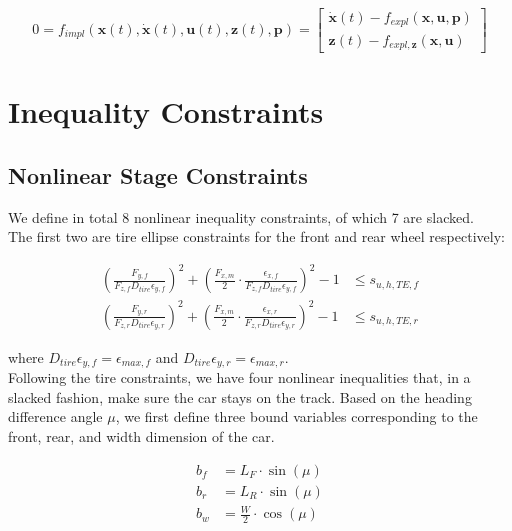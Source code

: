 \documentclass[
a4paper, %
10pt, %
notitlepage,
english]{CSUniSchoolLabReport}
\begin{document}
\begin{equation}
	0 = f_{impl}(\mathbf{x}(t), \dot{\mathbf{x}}(t), \mathbf{u}(t), \mathbf{z}(t), \mathbf{p}) = 
	\left[\begin{array}{c}
		\dot{\mathbf{x}}(t) - f_{expl}(\mathbf{x}, \mathbf{u}, \mathbf{p}) \\
		\mathbf{z}(t) - f_{expl, \mathbf{z}}(\mathbf{x}, \mathbf{u})
	\end{array}\right]
\end{equation}


\section{Inequality Constraints}

\subsection{Nonlinear Stage Constraints}

We define in total 8 nonlinear inequality constraints, of which 7 are slacked.\\
The first two are tire ellipse constraints for the front and rear wheel respectively:

\begin{align}
	\left( \frac{F_{y, f}} {F_{z, f} D_{tire} \epsilon_{y, f}} \right)^2 
	+ \left(\frac{F_{x,m}}{2} \cdot \frac{\epsilon_{x, f}}{F_{z, f} D_{tire} \epsilon_{y, f}} \right) ^2 
	- 1 
	&\leq s_{u,h,TE,f} \\
	\left( \frac{F_{y, r}} {F_{z, r} D_{tire} \epsilon_{y, r}} \right)^2 
	+ \left(\frac{F_{x,m}}{2} \cdot \frac{\epsilon_{x, r}}{F_{z, r} D_{tire} \epsilon_{y, r}} \right) ^2 
	- 1
	&\leq s_{u,h,TE,r}
\end{align}

where $D_{tire} \epsilon_{y, f} = \epsilon_{max, f}$ and $D_{tire} \epsilon_{y, r} = \epsilon_{max, r}$.\\
Following the tire constraints, we have four nonlinear inequalities that, in a slacked fashion, make sure the car stays on the track. Based on the heading difference angle $\mu$, we first define three bound variables corresponding to the front, rear, and width dimension of the car.

\begin{align}
	b_f &= L_F \cdot \sin(\mu) \\
	b_r &= L_R \cdot \sin(\mu) \\
	b_w &= \frac{W}{2} \cdot \cos(\mu)
\end{align}
\end{document}
